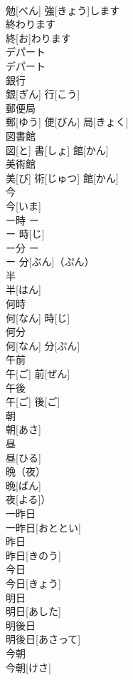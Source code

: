 \documentclass[8pt]{extreport}
\begin{document}
\begin{CJK}{UTF8}{min}
\\	勉[べん] 強[きょう]します		
\\	終わります	
\\	終[お]わります		
\\	デパート	
\\	デパート		
\\	銀行	
\\	銀[ぎん] 行[こう]		
\\	郵便局	
\\	郵[ゆう] 便[びん] 局[きょく]		
\\	図書館	
\\	図[と] 書[しょ] 館[かん]		
\\	美術館	
\\	美[び] 術[じゅつ] 館[かん]		
\\	今	
\\	今[いま]		
\\	ー時	ー 
\\	ー 時[じ]		
\\	ー分	ー 
\\	ー 分[ぶん]（ぷん）		
\\	半	
\\	半[はん]		
\\	何時	
\\	何[なん] 時[じ]		
\\	何分	
\\	何[なん] 分[ぷん]		
\\	午前	
\\	午[ご] 前[ぜん]		
\\	午後	
\\	午[ご] 後[ご]		
\\	朝	
\\	朝[あさ]		
\\	昼	
\\	昼[ひる]		
\\	晩（夜）	
\\	晩[ばん]
\\	夜[よる]）		
\\	一昨日	
\\	一昨日[おととい]		
\\	昨日	
\\	昨日[きのう]		
\\	今日	
\\	今日[きょう]		
\\	明日	
\\	明日[あした]		
\\	明後日	
\\	明後日[あさって]		
\\	今朝	
\\	今朝[けさ]		

\end{CJK}
\end{document}
